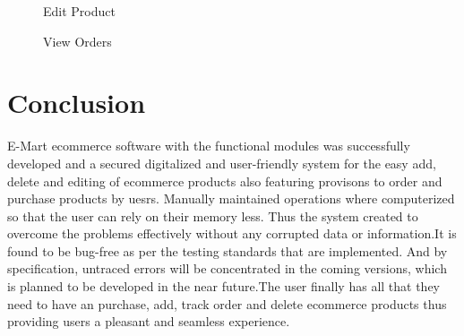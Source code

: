 \documentclass[11pt]{report}
\begin{document}
\begin{figure}[H]
	\caption{Edit Product}
\end{figure}
\begin{figure}[H]
	\caption{View Orders}
\end{figure}
 \chapter{Conclusion}
 E-Mart ecommerce software with the functional modules was successfully developed and a secured
 digitalized and user-friendly system for the easy add, delete and editing of ecommerce products also featuring provisons to order and purchase products by uesrs.
 Manually maintained operations where computerized so that the user can rely on their memory
 less. Thus the system created to overcome the problems effectively without any corrupted data or
 information.It is found to be bug-free as per the testing standards that are implemented. And by
 specification, untraced errors will be concentrated in the coming versions, which is planned to be
 developed in the near future.The user finally has all that they need to have an
 purchase, add, track order and delete ecommerce products thus providing users a pleasant and seamless experience.
 \label {con}
\end{document}
